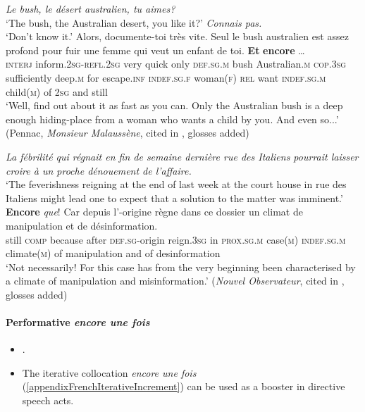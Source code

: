 \begin{exe}
	\ex\label{exAppendixFrenchEncoreConcessiveInterjection1}
		\begin{xlist}
		\textit{Le bush, le désert australien, tu aimes?}\\
		 \lq The bush, the Australian desert, you like it?'
		\textit{Connais pas.}\\
	 \lq Don't know it.'
		\gll Alors, documente-toi très vite. Seul le bush australien est assez profond pour fuir une femme qui veut un enfant de toi. \textbf{Et} \textbf{encore} …\\
		\textsc{interj} inform.2\textsc{sg}-\textsc{refl}.2\textsc{sg} very quick only \textsc{def}.\textsc{sg}.\textsc{m} bush Australian.\textsc{m} \textsc{cop}.3\textsc{sg} sufficiently deep.\textsc{m} for escape.\textsc{inf} \textsc{indef}.\textsc{sg}.\textsc{f} woman(\textsc{f}) \textsc{rel} want \textsc{indef}.\textsc{sg}.\textsc{m} child(\textsc{m}) of 2\textsc{sg} and still\\
		\glt \lq Well, find out about it as fast as you can. Only the Australian bush is a deep enough hiding-place from a woman who wants a child by you. And even so...' (Pennac, \textit{Monsieur Malaussène}, cited in \cite[193]{MosegaardHansen2008}, glosses added)
\end{xlist}
	\ex\label{exAppendixFrenchEncoreConcessiveInterjection2}
		\textit{La fébrilité qui régnait en fin de semaine dernière rue des Italiens pourrait laisser croire à un proche dénouement de l’affaire.}\\
		\lq The feverishness reigning at the end of last week at the court house in rue des Italiens might lead one to expect that a solution to the matter was imminent.'
		\exi{}\gll \textbf{Encore} \textit{que}! Car depuis l’-origine règne dans ce dossier un climat de manipulation et de désinformation.\\
		still \textsc{comp} because after \textsc{def}.\textsc{sg}-origin reign.3\textsc{sg} in \textsc{prox}.\textsc{sg}.\textsc{m} case(\textsc{m}) \textsc{indef}.\textsc{sg}.\textsc{m} climate(\textsc{m}) of manipulation and of desinformation\\
		\pagebreak
		\glt \lq Not necessarily! For this case has from the very beginning been characterised by a climate of manipulation and misinformation.' (\textit{Nouvel Observateur}, cited in \cite[192–193]{MosegaardHansen2008}, glosses added)
\end{exe}

\paragraph{Performative \textit{encore une fois}}\label{appendixFrenchEncoreIterativeIncrement}
\begin{itemize}
	\item \textcite{Borillo1984}.
	\item The iterative collocation \textit{encore une fois} (\ref{appendixFrenchIterativeIncrement}) can be used as a booster in directive speech acts.
\end{itemize}

